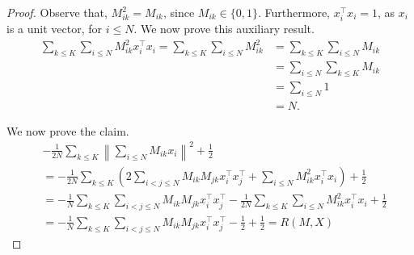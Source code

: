 \begin{proof}
%
Observe that, $M^2_{ik} = M_{ik}$, since $M_{ik} \in \{0, 1\}$. Furthermore, $x_i^\top x_i = 1$, as $x_i$ is a unit vector, for $i \leq N$. We now prove this auxiliary result.
%
\begin{align}
\sum_{k \leq K} \sum_{i \leq N} M_{ik}^2x_i^\top x_i
= \sum_{k \leq K} \sum_{i \leq N} M_{ik}^2
&= \sum_{k \leq K} \sum_{i \leq N} M_{ik}\\ 
&= \sum_{i \leq N}\sum_{k \leq K}M_{ik}\\\
&= \sum_{i \leq N} 1\\
&= N.
\end{align}

We now prove the claim.
%
\begin{align}
&- \frac{1}{2N}\sum_{k \leq K}\left\|\sum_{i \leq N} M_{ik}x_i\right\|^2 + \frac{1}{2}\\
&= -\frac{1}{2N}\sum_{k \leq K}\left(2\sum_{i < j \leq N}M_{ik}M_{jk}x_i^\top x_j^\top + \sum_{i \leq N} M_{ik}^2 x_i^\top x_i\right) + \frac{1}{2}\\
&= -\frac{1}{N}\sum_{k \leq K}\sum_{i < j \leq N}M_{ik}M_{jk}x_i^\top x_j^\top -\frac{1}{2N}\sum_{k \leq K} \sum_{i \leq N} M_{ik}^2 x_i^\top x_i + \frac{1}{2}\\
&= -\frac{1}{N}\sum_{k \leq K}\sum_{i < j \leq N}M_{ik}M_{jk}x_i^\top x_j^\top -\frac{1}{2} + \frac{1}{2} = R(M, X)
\end{align}
%
\end{proof}

